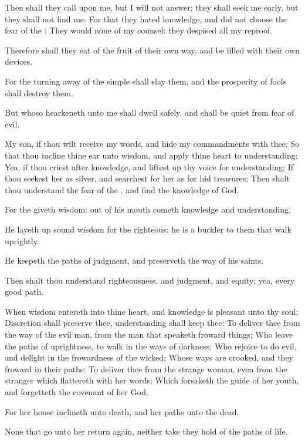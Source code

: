 \Verse Then shall they call upon me, but I will not answer; they shall seek me early, but they shall not find me: \Verse For that they hated knowledge, and did not choose the fear of the \LORD: \Verse They would none of my counsel: they despised all my reproof.

\Verse Therefore shall they eat of the fruit of their own way, and be filled with their own devices.

\Verse For the turning away of the simple shall slay them, and the prosperity of fools shall destroy them.

\Verse But whoso hearkeneth unto me shall dwell safely, and shall be quiet from fear of evil.


\Chapter
\Verse My son, if thou wilt receive my words, and hide my commandments with thee; \Verse So that thou incline thine ear unto wisdom, and apply thine heart to understanding; \Verse Yea, if thou criest after knowledge, and liftest up thy voice for understanding; \Verse If thou seekest her as silver, and searchest for her as for hid treasures; \Verse Then shalt thou understand the fear of the \LORD, and find the knowledge of God.

\Verse For the \LORD giveth wisdom: out of his mouth cometh knowledge and understanding.

\Verse He layeth up sound wisdom for the righteous: he is a buckler to them that walk uprightly.

\Verse He keepeth the paths of judgment, and preserveth the way of his saints.

\Verse Then shalt thou understand righteousness, and judgment, and equity; yea, every good path.

\Verse When wisdom entereth into thine heart, and knowledge is pleasant unto thy soul; \Verse Discretion shall preserve thee, understanding shall keep thee: \Verse To deliver thee from the way of the evil man, from the man that speaketh froward things; \Verse Who leave the paths of uprightness, to walk in the ways of darkness; \Verse Who rejoice to do evil, and delight in the frowardness of the wicked; \Verse Whose ways are crooked, and they froward in their paths: \Verse To deliver thee from the strange woman, even from the stranger which flattereth with her words; \Verse Which forsaketh the guide of her youth, and forgetteth the covenant of her God.

\Verse For her house inclineth unto death, and her paths unto the dead.

\Verse None that go unto her return again, neither take they hold of the paths of life.


